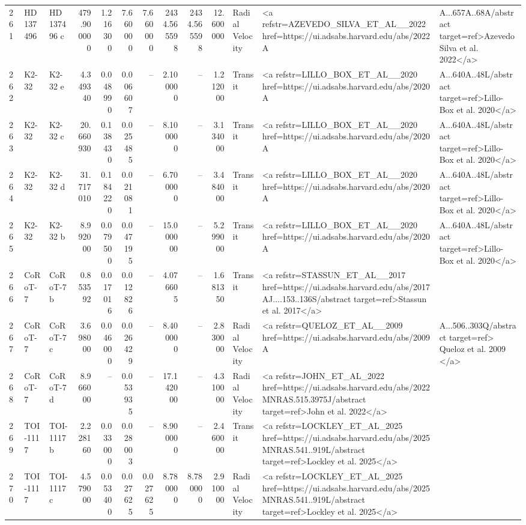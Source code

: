 \begin{tabular}{lllrrrrrrrll}
261 & HD 137496 & HD 137496 c & 479.900000 & 1.216300 & 7.660000 & 7.660000 & 2434.565598 & 2434.565598 & 12.600000 & Radial Velocity & <a refstr=AZEVEDO_SILVA_ET_AL__2022 href=https://ui.adsabs.harvard.edu/abs/2022A&A...657A..68A/abstract target=ref>Azevedo Silva et al. 2022</a> \\
262 & K2-32 & K2-32 e & 4.349340 & 0.048990 & 0.006607 & -- & 2.100000 & -- & 1.212000 & Transit & <a refstr=LILLO_BOX_ET_AL__2020 href=https://ui.adsabs.harvard.edu/abs/2020A&A...640A..48L/abstract target=ref>Lillo-Box et al. 2020</a> \\
263 & K2-32 & K2-32 c & 20.660930 & 0.138430 & 0.025485 & -- & 8.100000 & -- & 3.134000 & Transit & <a refstr=LILLO_BOX_ET_AL__2020 href=https://ui.adsabs.harvard.edu/abs/2020A&A...640A..48L/abstract target=ref>Lillo-Box et al. 2020</a> \\
264 & K2-32 & K2-32 d & 31.717010 & 0.184220 & 0.021081 & -- & 6.700000 & -- & 3.484000 & Transit & <a refstr=LILLO_BOX_ET_AL__2020 href=https://ui.adsabs.harvard.edu/abs/2020A&A...640A..48L/abstract target=ref>Lillo-Box et al. 2020</a> \\
265 & K2-32 & K2-32 b & 8.992000 & 0.079500 & 0.047195 & -- & 15.000000 & -- & 5.299000 & Transit & <a refstr=LILLO_BOX_ET_AL__2020 href=https://ui.adsabs.harvard.edu/abs/2020A&A...640A..48L/abstract target=ref>Lillo-Box et al. 2020</a> \\
266 & CoRoT-7 & CoRoT-7 b & 0.853592 & 0.017016 & 0.012826 & -- & 4.076605 & -- & 1.681350 & Transit & <a refstr=STASSUN_ET_AL__2017 href=https://ui.adsabs.harvard.edu/abs/2017AJ....153..136S/abstract target=ref>Stassun et al. 2017</a> \\
267 & CoRoT-7 & CoRoT-7 c & 3.698000 & 0.046000 & 0.026429 & -- & 8.400000 & -- & 2.830000 & Radial Velocity & <a refstr=QUELOZ_ET_AL__2009 href=https://ui.adsabs.harvard.edu/abs/2009A&A...506..303Q/abstract target=ref> Queloz et al. 2009 </a> \\
268 & CoRoT-7 & CoRoT-7 d & 8.966000 & -- & 0.053935 & -- & 17.142000 & -- & 4.310000 & Radial Velocity & <a refstr=JOHN_ET_AL_2022 href=https://ui.adsabs.harvard.edu/abs/2022MNRAS.515.3975J/abstract target=ref>John et al. 2022</a> \\
269 & TOI-1117 & TOI-1117 b & 2.228160 & 0.033000 & 0.028003 & -- & 8.900000 & -- & 2.460000 & Transit & <a refstr=LOCKLEY_ET_AL_2025 href=https://ui.adsabs.harvard.edu/abs/2025MNRAS.541..919L/abstract target=ref>Lockley et al. 2025</a> \\
270 & TOI-1117 & TOI-1117 c & 4.579000 & 0.053400 & 0.027625 & 0.027625 & 8.780000 & 8.780000 & 2.910000 & Radial Velocity & <a refstr=LOCKLEY_ET_AL_2025 href=https://ui.adsabs.harvard.edu/abs/2025MNRAS.541..919L/abstract target=ref>Lockley et al. 2025</a> \\

\end{tabular}
